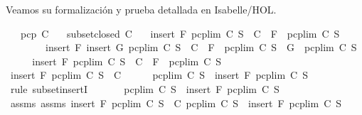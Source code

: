 \begin{isabellebody}
\begin{isamarkuptext}
  Veamos su formalización y prueba detallada en Isabelle/HOL.%
\end{isamarkuptext}\isamarkuptrue%
\isamarkupfalse%
\isanewline
\ \ \ {\isachardoublequoteopen}pcp\ C{\isachardoublequoteclose}\isanewline
\ \ \ {\isachardoublequoteopen}subset{\isacharunderscore}closed\ C{\isachardoublequoteclose}\isanewline
\ \ \ {\isachardoublequoteopen}insert\ F\ {\isacharparenleft}pcp{\isacharunderscore}lim\ C\ S{\isacharparenright}\ {\isasymin}\ C\ {\isasymLongrightarrow}\ F\ {\isasymin}\ pcp{\isacharunderscore}lim\ C\ S{\isachardoublequoteclose}\isanewline
\ \ \ \ \ \ \ \ {\isachardoublequoteopen}insert\ F\ {\isacharparenleft}insert\ G\ {\isacharparenleft}pcp{\isacharunderscore}lim\ C\ S{\isacharparenright}{\isacharparenright}\ {\isasymin}\ C\ {\isasymLongrightarrow}\ F\ {\isasymin}\ pcp{\isacharunderscore}lim\ C\ S\ {\isasymand}\ G\ {\isasymin}\ pcp{\isacharunderscore}lim\ C\ S{\isachardoublequoteclose}\isanewline
%
\isadelimproof
%
\endisadelimproof
%
\isatagproof
{}\isamarkupfalse%
\ {\isacharminus}\isanewline
\ \ \isamarkupfalse%
\ {\isachardoublequoteopen}insert\ F\ {\isacharparenleft}pcp{\isacharunderscore}lim\ C\ S{\isacharparenright}\ {\isasymin}\ C\ {\isasymLongrightarrow}\ F\ {\isasymin}\ pcp{\isacharunderscore}lim\ C\ S{\isachardoublequoteclose}\isanewline
\ \ \isamarkupfalse%
\ {\isacharminus}\isanewline
\ \ \ \ \isamarkupfalse%
\ {\isachardoublequoteopen}insert\ F\ {\isacharparenleft}pcp{\isacharunderscore}lim\ C\ S{\isacharparenright}\ {\isasymin}\ C{\isachardoublequoteclose}\isanewline
\ \ \ \ \isamarkupfalse%
\ {\isachardoublequoteopen}pcp{\isacharunderscore}lim\ C\ S\ {\isasymsubseteq}\ insert\ F\ {\isacharparenleft}pcp{\isacharunderscore}lim\ C\ S{\isacharparenright}{\isachardoublequoteclose}\isanewline
\ \ \ \ \ \ \isamarkupfalse%
\ {\isacharparenleft}rule\ subset{\isacharunderscore}insertI{\isacharparenright}\ \isanewline
\ \ \ \ \isamarkupfalse%
\ {\isachardoublequoteopen}pcp{\isacharunderscore}lim\ C\ S\ {\isacharequal}\ insert\ F\ {\isacharparenleft}pcp{\isacharunderscore}lim\ C\ S{\isacharparenright}{\isachardoublequoteclose}\isanewline
\ \ \ \ \ \ \isamarkupfalse%
\ assms{\isacharparenleft}{}{\isacharparenright}\ assms{\isacharparenleft}{}{\isacharparenright}\ {\isacartoucheopen}insert\ F\ {\isacharparenleft}pcp{\isacharunderscore}lim\ C\ S{\isacharparenright}\ {\isasymin}\ C{\isacartoucheclose}\ {\isacartoucheopen}pcp{\isacharunderscore}lim\ C\ S\ {\isasymsubseteq}\ insert\ F\ {\isacharparenleft}pcp{\isacharunderscore}lim\ C\ S{\isacharparenright}{\isacartoucheclose}\ \isamarkupfalse%

\end{isabellebody}
